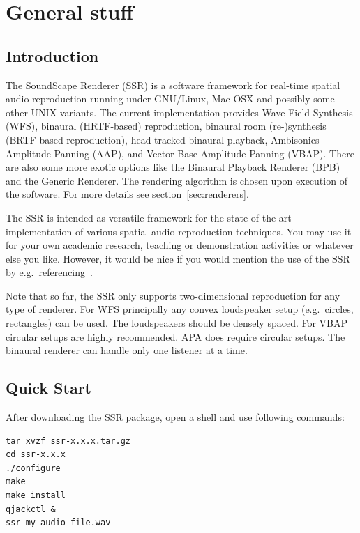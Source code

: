 \section{General stuff}

\subsection{Introduction}

The SoundScape Renderer (SSR) is a software framework for real-time spatial
audio reproduction running under GNU/Linux, Mac OSX and possibly some other UNIX
variants.
The current implementation provides Wave Field Synthesis (WFS),
binaural (HRTF-based) reproduction, binaural room (re-)synthesis (BRTF-based
reproduction), head-tracked binaural playback, Ambisonics Amplitude Panning 
(AAP), and Vector Base Amplitude Panning (VBAP).
There are also some more exotic options like the Binaural Playback Renderer
(BPB) and the Generic Renderer.
The rendering algorithm is chosen upon execution of the software.
For more details see section~\ref{sec:renderers}.

The SSR is intended as versatile framework for the state of the art
implementation of various spatial audio reproduction techniques. You may use it
for your own academic research, teaching or demonstration activities or whatever
else you like.
However, it would be nice if you would mention the use of the SSR by
e.g.\ referencing~\cite{Geier08:AES}.

Note that so far, the SSR only supports two-dimensional reproduction for any
type of renderer. For WFS principally any convex loudspeaker setup
(e.g.\ circles, rectangles) can be used. The loudspeakers should be densely
spaced. For VBAP circular setups are highly recommended. APA does require
circular setups. The binaural renderer can handle only one listener at a time.

\subsection{Quick Start}
\label{sec:quick_start}

After downloading the SSR package, open a shell and use following commands:

\begin{verbatim}
tar xvzf ssr-x.x.x.tar.gz
cd ssr-x.x.x
./configure
make
make install
qjackctl &
ssr my_audio_file.wav
\end{verbatim}

